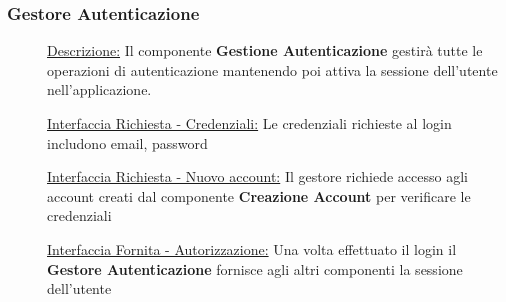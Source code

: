 \documentclass{article}
\begin{document}
\subsubsection{Gestore Autenticazione}
\begin{description}
    \item[] \underline{Descrizione:} Il componente \textbf{Gestione Autenticazione} gestirà tutte le operazioni di autenticazione mantenendo poi attiva la sessione dell'utente nell'applicazione.
    \item[] \underline{Interfaccia Richiesta - Credenziali:} Le credenziali richieste al login includono email, password
    \item[] \underline{Interfaccia Richiesta - Nuovo account:} Il gestore richiede accesso agli account creati dal componente \textbf{Creazione Account} per verificare le credenziali
    \item[] \underline{Interfaccia Fornita - Autorizzazione:} Una volta effettuato il login il \textbf{Gestore Autenticazione} fornisce agli altri componenti la sessione dell'utente
\end{description}
\end{document}
